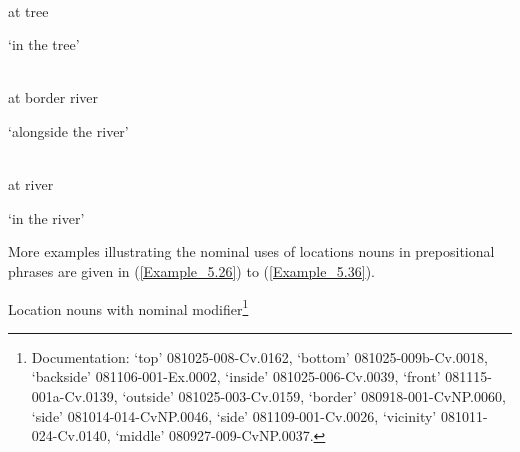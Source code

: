 \ea
\label{Example_5.23}
\gll {} \\ %
at    tree\\
\glt

‘in the tree’\\
\z


\ea
\label{Example_5.24}
 {} {}\\ %
at  border  river    \\
\glt

‘alongside the river’\\
\z


\ea
\label{Example_5.25}
 {}\\ %
 at    river    \\
\glt

‘in the river’\\
\z



More examples illustrating the nominal uses of locations nouns in prepositional phrases are given in (\ref{Example_5.26}) to (\ref{Example_5.36}).


\begin{styleExampleTitle}
Location nouns with nominal modifier\footnote{Documentation:  ‘top’ 081025-008-Cv.0162,  ‘bottom’ 081025-009b-Cv.0018,  ‘backside’ 081106-001-Ex.0002,  ‘inside’ 081025-006-Cv.0039,  ‘front’ 081115-001a-Cv.0139,  ‘outside’ 081025-003-Cv.0159,  ‘border’ 080918-001-CvNP.0060,  ‘side’ 081014-014-CvNP.0046,  ‘side’ 081109-001-Cv.0026,  ‘vicinity’ 081011-024-Cv.0140,  ‘middle’ 080927-009-CvNP.0037.}
\end{styleExampleTitle}






